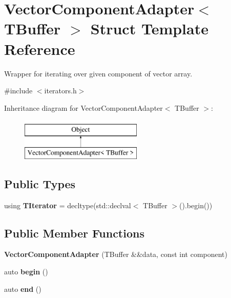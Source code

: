 \hypertarget{structVectorComponentAdapter}{}\section{Vector\+Component\+Adapter$<$ T\+Buffer $>$ Struct Template Reference}
\label{structVectorComponentAdapter}


Wrapper for iterating over given component of vector array.  




{\ttfamily \#include $<$iterators.\+h$>$}

Inheritance diagram for Vector\+Component\+Adapter$<$ T\+Buffer $>$\+:\begin{figure}[H]
\begin{center}
\leavevmode
\includegraphics[height=2.000000cm]{structVectorComponentAdapter}
\end{center}
\end{figure}
\subsection*{Public Types}
\begin{DoxyCompactItemize}
\item 
\hypertarget{structVectorComponentAdapter_a254718439b8e7be6edd76cc0369212e3}{}\label{structVectorComponentAdapter_a254718439b8e7be6edd76cc0369212e3} 
using {\bfseries T\+Iterator} = decltype(std\+::declval$<$ T\+Buffer $>$().begin())
\end{DoxyCompactItemize}
\subsection*{Public Member Functions}
\begin{DoxyCompactItemize}
\item 
\hypertarget{structVectorComponentAdapter_acd5018da29e2893c31d3e43b14bce848}{}\label{structVectorComponentAdapter_acd5018da29e2893c31d3e43b14bce848} 
{\bfseries Vector\+Component\+Adapter} (T\+Buffer \&\&data, const int component)
\item 
\hypertarget{structVectorComponentAdapter_ab07b1f9f7c0115c97268fdbfabea810c}{}\label{structVectorComponentAdapter_ab07b1f9f7c0115c97268fdbfabea810c} 
auto {\bfseries begin} ()
\item 
\hypertarget{structVectorComponentAdapter_af7a5f4f4363c0fb2cc3aa3384cc4f2a5}{}\label{structVectorComponentAdapter_af7a5f4f4363c0fb2cc3aa3384cc4f2a5} 
auto {\bfseries end} ()
\end{DoxyCompactItemize}
